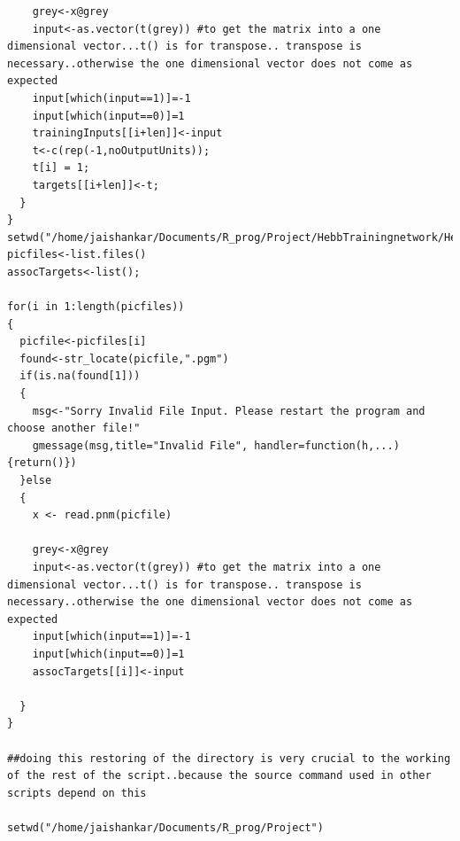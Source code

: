 \documentclass[a4paper,12pt]{report}
\begin{document}
\begin{verbatim}
    grey<-x@grey
    input<-as.vector(t(grey)) #to get the matrix into a one dimensional vector...t() is for transpose.. transpose is necessary..otherwise the one dimensional vector does not come as expected
    input[which(input==1)]=-1
    input[which(input==0)]=1
    trainingInputs[[i+len]]<-input
    t<-c(rep(-1,noOutputUnits));
    t[i] = 1;
    targets[[i+len]]<-t;
  }
}
setwd("/home/jaishankar/Documents/R_prog/Project/HebbTrainingnetwork/HebbTargets/")
picfiles<-list.files()
assocTargets<-list();

for(i in 1:length(picfiles))
{
  picfile<-picfiles[i]
  found<-str_locate(picfile,".pgm")
  if(is.na(found[1]))
  {
    msg<-"Sorry Invalid File Input. Please restart the program and choose another file!"
    gmessage(msg,title="Invalid File", handler=function(h,...){return()})
  }else
  {
    x <- read.pnm(picfile)
    
    grey<-x@grey
    input<-as.vector(t(grey)) #to get the matrix into a one dimensional vector...t() is for transpose.. transpose is necessary..otherwise the one dimensional vector does not come as expected
    input[which(input==1)]=-1
    input[which(input==0)]=1
    assocTargets[[i]]<-input
    
  }
}

##doing this restoring of the directory is very crucial to the working of the rest of the script..because the source command used in other scripts depend on this

setwd("/home/jaishankar/Documents/R_prog/Project")
\end{verbatim}
\end{document}
